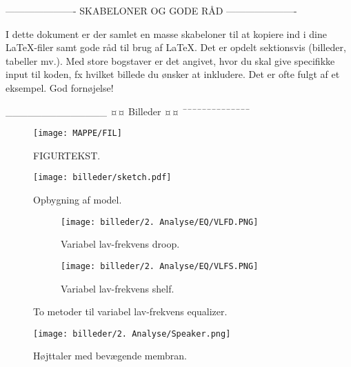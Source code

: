 

----------------------
SKABELONER OG GODE RÅD
----------------------

I dette dokument er der samlet en masse skabeloner til at kopiere ind i dine LaTeX-filer samt gode råd til brug af LaTeX. Det er opdelt sektionsvis (billeder, tabeller mv.). Med store bogstaver er det angivet, hvor du skal give specifikke input til koden, fx hvilket billede du ønsker at inkludere. Det er ofte fulgt af et eksempel. God fornøjelse!

______________
¤¤ Billeder ¤¤
¯¯¯¯¯¯¯¯¯¯¯¯¯¯

\begin{figure}[htbp] %
	\centering
	\texttt{[image: MAPPE/FIL]}
	\caption{FIGURTEKST.}
	\label{fig:LABEL}
\end{figure}

\begin{figure}[H]
	\centering
	\texttt{[image: billeder/sketch.pdf]}
	\caption{Opbygning af model.}
	\label{fig:sketch}
\end{figure}

\begin{figure}[H]
    \centering
    \begin{subfigure}{.5\textwidth}
        \centering
        \texttt{[image: billeder/2. Analyse/EQ/VLFD.PNG]}
        \caption{Variabel lav-frekvens droop.}
        \label{fig:VLFD}
    \end{subfigure}%
    \begin{subfigure}{.5\textwidth}
        \centering
        \texttt{[image: billeder/2. Analyse/EQ/VLFS.PNG]}
        \caption{Variabel lav-frekvens shelf.}
        \label{fig:VLFS}
    \end{subfigure}
    \caption{To metoder til variabel lav-frekvens equalizer.}
    \label{fig:ParametricEQVLF}
\end{figure}

\begin{wrapfigure}{r}{0.55\textwidth}
    \centering
    \texttt{[image: billeder/2. Analyse/Speaker.png]}
    \caption{Højttaler med bevægende membran.}
    \label{fig:højttaler}
    \vspace{-15pt}
\end{wrapfigure}


